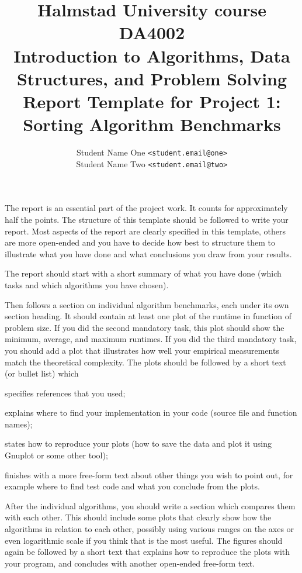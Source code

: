 \documentclass[a4paper,10pt]{article}
\begin{document}
\title{
  {\small
    Halmstad University course DA4002\\
    Introduction to Algorithms, Data Structures, and Problem Solving\\
  }
  Report Template for Project 1:\\
  Sorting Algorithm Benchmarks
}
\author{
  Student Name One \texttt{<student.email@one>}\\
  Student Name Two \texttt{<student.email@two>}
}
\maketitle



The report is an essential part of the project work.
It counts for approximately half the points.
The structure of this template should be followed to write your report.
Most aspects of the report are clearly specified in this template, others are more open-ended and you have to decide how best to structure them to illustrate what you have done and what conclusions you draw from your results.

The report should start with a short summary of what you have done (which tasks and which algorithms you have chosen).

Then follows a section on individual algorithm benchmarks, each under its own section heading.
It should contain at least one plot of the runtime in function of problem size.
If you did the second mandatory task, this plot should show the minimum, average, and maximum runtimes.
If you did the third mandatory task, you should add a plot that illustrates how well your empirical measurements match the theoretical complexity.
The plots should be followed by a short text (or bullet list) which
\begin{compactitem}
\item
  specifies references that you used;
\item
  explains where to find your implementation in your code (source file and function names);
\item
  states how to reproduce your plots (how to save the data and plot it using Gnuplot or some other tool);
\item
  finishes with a more free-form text about other things you wish to point out, for example where to find test code and what you conclude from the plots.
\end{compactitem}

After the individual algorithms, you should write a section which compares them with each other.
This should include some plots that clearly show how the algorithms in relation to each other, possibly using various ranges on the axes or even logarithmic scale if you think that is the most useful.
The figures should again be followed by a short text that explains how to reproduce the plots with your program, and concludes with another open-ended free-form text.
\end{document}
